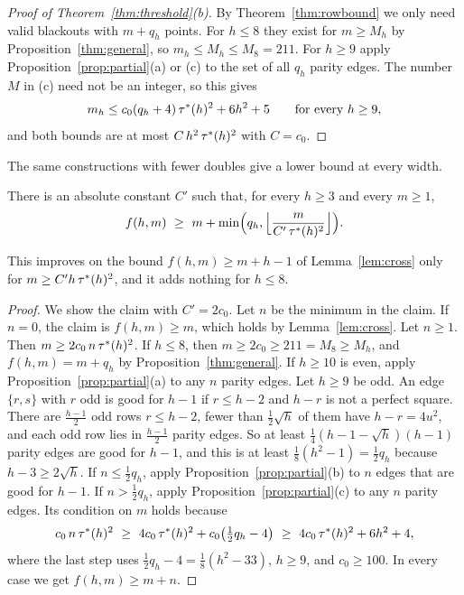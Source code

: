 \begin{proof}[Proof of Theorem~\ref{thm:threshold}(b)]
By Theorem~\ref{thm:rowbound} we only need valid blackouts with $m+q_h$ points. For $h\le8$
they exist for $m\ge M_h$ by Proposition~\ref{thm:general}, so $m_h\le M_h\le M_8=211$. For
$h\ge9$ apply Proposition~\ref{prop:partial}(a) or (c) to the set of all $q_h$ parity
edges. The number $M$ in (c) need not be an integer, so this gives
\begin{equation}\label{eq:explicitbound}
 m_h\le c_0(q_h+4)\,{\tau^*}(h)^2+6h^2+5\qquad\text{for every }h\ge9 ,
\end{equation}
and both bounds are at most $C\,h^2\,{\tau^*}(h)^2$ with $C=c_0$.
\end{proof}

The same constructions with fewer doubles give a lower bound at every width.

\begin{corollary}\label{cor:everywidth}
There is an absolute constant $C'$ such that, for every $h\ge3$ and every $m\ge1$,
\[
 f(h,m)\ \ge\ m+\min\Bigl(q_h,\Bigl\lfloor\frac{m}{C'\,\tmax(h)^2}\Bigr\rfloor\Bigr).
\]
\end{corollary}

This improves on the bound $f(h,m)\ge m+h-1$ of Lemma~\ref{lem:cross} only for
$m\ge C'h\,{\tau^*}(h)^2$, and it adds nothing for $h\le8$.

\begin{proof}
We show the claim with $C'=2c_0$. Let $n$ be the minimum in the claim. If $n=0$, the claim
is $f(h,m)\ge m$, which holds by Lemma~\ref{lem:cross}. Let $n\ge1$. Then
$m\ge2c_0\,n\,{\tau^*}(h)^2$. If $h\le8$, then $m\ge2c_0\ge211=M_8\ge M_h$, and
$f(h,m)=m+q_h$ by Proposition~\ref{thm:general}. If $h\ge10$ is even, apply Proposition~\ref{prop:partial}(a)
to any $n$ parity edges. Let $h\ge9$ be odd. An edge $\{r,s\}$ with $r$ odd is good for
$h-1$ if $r\le h-2$ and $h-r$ is not a perfect square. There are $\frac{h-1}2$ odd rows
$r\le h-2$, fewer than $\frac12\sqrt h$ of them have $h-r=4u^2$, and each odd row lies in
$\frac{h-1}2$ parity edges. So at least $\frac14(h-1-\sqrt h)(h-1)$ parity edges are good
for $h-1$, and this is at least $\frac18(h^2-1)=\frac12q_h$ because $h-3\ge2\sqrt h$. If
$n\le\frac12q_h$, apply Proposition~\ref{prop:partial}(b) to $n$ edges that are good for
$h-1$. If $n>\frac12q_h$, apply Proposition~\ref{prop:partial}(c) to any $n$ parity edges.
Its condition on $m$ holds because
\[
 c_0\,n\,\tmax(h)^2\ \ge\ 4c_0\,\tmax(h)^2+c_0\bigl(\tfrac12q_h-4\bigr)
 \ \ge\ 4c_0\,\tmax(h)^2+6h^2+4 ,
\]
where the last step uses $\frac12q_h-4=\frac18(h^2-33)$, $h\ge9$, and $c_0\ge100$. In
every case we get $f(h,m)\ge m+n$.
\end{proof}

